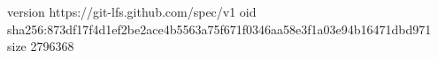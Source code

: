 version https://git-lfs.github.com/spec/v1
oid sha256:873df17f4d1ef2be2ace4b5563a75f671f0346aa58e3f1a03e94b16471dbd971
size 2796368
